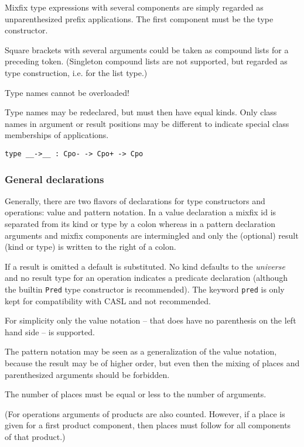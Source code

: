 \documentclass{article}
\begin{document}
Mixfix type expressions with several components are simply regarded as
unparenthesized prefix applications. The first component must be the
type constructor.

Square brackets with several arguments could be taken as compound lists for a
preceding token. (Singleton compound lists are not supported, but regarded as
type construction, i.e. for the list type.)

Type names cannot be overloaded! 

Type names may be redeclared, but must then have equal kinds. Only
class names in argument or result positions may be different to indicate
special class memberships of applications.

\begin{verbatim}
type __->__ : Cpo- -> Cpo+ -> Cpo
\end{verbatim}

\subsubsection*{General declarations}

Generally, there are two flavors of declarations for type constructors and
operations: value and pattern notation. In a value declaration a mixfix id is
separated from its kind or type by a colon whereas in a pattern declaration
arguments and mixfix components are intermingled and only the (optional)
result (kind or type) is written to the right of a colon. 

If a result is omitted a default is substituted. No kind defaults to the
\emph{universe} and no result type for an operation indicates a
predicate declaration (although the builtin \texttt{Pred} type constructor is
recommended). The keyword \texttt{pred} is only kept for compatibility with
CASL and not recommended.

For simplicity only the value notation -- that does have no parenthesis on the
left hand side -- is supported. 

The pattern notation may be seen as a generalization of the value notation,
because the result may be of higher order, but even then the mixing of places
and parenthesized arguments should be forbidden.

The number of places must be equal or less to the number of arguments.

(For operations arguments of products are also counted. However, if a place is
given for a first product component, then places must follow for all
components of that product.)
\end{document}
